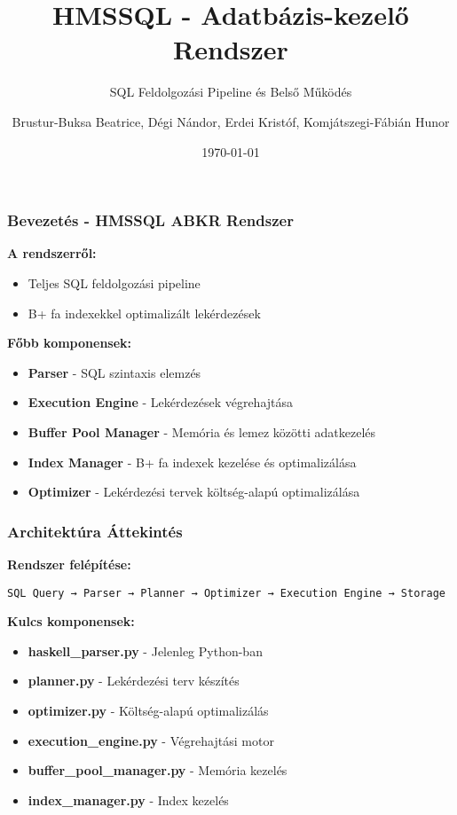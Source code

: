\documentclass{beamer}
\title{HMSSQL - Adatbázis-kezelő Rendszer}
\subtitle{SQL Feldolgozási Pipeline és Belső Működés}
\author{Brustur-Buksa Beatrice, Dégi Nándor, Erdei Kristóf, Komjátszegi-Fábián Hunor}
\date{\today}
\begin{document}
\frame{\titlepage}

\begin{frame}
\frametitle{Bevezetés - HMSSQL ABKR Rendszer}

\textbf{A rendszerről:}
\begin{itemize}
    \item Teljes SQL feldolgozási pipeline
    \item B+ fa indexekkel optimalizált lekérdezések
\end{itemize}

\vspace{0.5cm}
\textbf{Főbb komponensek:}
\begin{itemize}
    \item \textbf{Parser} - SQL szintaxis elemzés
    \item \textbf{Execution Engine} - Lekérdezések végrehajtása
    \item \textbf{Buffer Pool Manager} - Memória és lemez közötti adatkezelés
    \item \textbf{Index Manager} - B+ fa indexek kezelése és optimalizálása
    \item \textbf{Optimizer} - Lekérdezési tervek költség-alapú optimalizálása
\end{itemize}

\end{frame}

\begin{frame}
\frametitle{Architektúra Áttekintés}

\textbf{Rendszer felépítése:}
\begin{center}
\texttt{SQL Query → Parser → Planner → Optimizer → Execution Engine → Storage}
\end{center}

\vspace{0.5cm}
\textbf{Kulcs komponensek:}
\begin{itemize}
    \item \textbf{haskell\_parser.py} - Jelenleg Python-ban
    \item \textbf{planner.py} - Lekérdezési terv készítés
    \item \textbf{optimizer.py} - Költség-alapú optimalizálás
    \item \textbf{execution\_engine.py} - Végrehajtási motor
    \item \textbf{buffer\_pool\_manager.py} - Memória kezelés
    \item \textbf{index\_manager.py} - Index kezelés
\end{itemize}

\end{frame}
\end{document}
